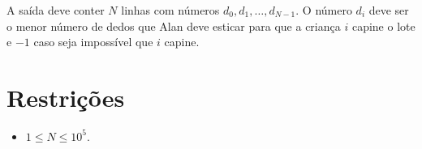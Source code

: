 A saída deve conter $N$ linhas com números $d_0, d_1, \ldots, d_{N - 1}$. O número $d_i$ deve ser o menor número de dedos que Alan deve esticar para que a criança $i$ capine o lote e $-1$ caso seja impossível que $i$ capine.

\section*{Restrições}

\begin{itemize}
\item $1 \leq N \leq 10^5$.
\end{itemize}

\exemplo
